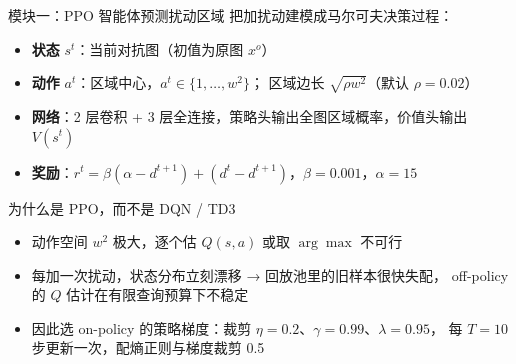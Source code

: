 \begin{frame}{模块一：PPO 智能体预测扰动区域}
  把加扰动建模成马尔可夫决策过程：
  \begin{itemize}
    \item \textbf{状态} $s^t$：当前对抗图（初值为原图 $x^o$）
    \item \textbf{动作} $a^t$：区域中心，$a^t \in \{1,\dots,w^2\}$；
          区域边长 $\sqrt{\rho w^2}$（默认 $\rho = 0.02$）
    \item \textbf{网络}：2 层卷积 + 3 层全连接，策略头输出全图区域概率，价值头输出 $V(s^t)$
    \item \textbf{奖励}：$r^t = \beta(\alpha - d^{t+1}) + (d^t - d^{t+1})$，$\beta=0.001$，$\alpha=15$
  \end{itemize}

  \vspace{0.4em}
  \begin{block}{为什么是 PPO，而不是 DQN / TD3}
    \begin{itemize}
      \item 动作空间 $w^2$ 极大，逐个估 $Q(s,a)$ 或取 $\arg\max$ 不可行
      \item 每加一次扰动，状态分布立刻漂移 → 回放池里的旧样本很快失配，
            off-policy 的 $Q$ 估计在有限查询预算下不稳定
      \item 因此选 on-policy 的策略梯度：裁剪 $\eta=0.2$、$\gamma=0.99$、$\lambda=0.95$，
            每 $T=10$ 步更新一次，配熵正则与梯度裁剪 0.5
    \end{itemize}
  \end{block}
\end{frame}

